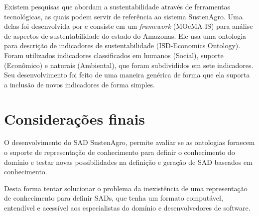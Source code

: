 Existem pesquisas que abordam a sustentabilidade através de ferramentas
tecnológicas, as quais podem servir de referência ao sistema SustenAgro.
Uma delas foi desenvolvida por \citep{brilhante:2006} e consiste
em um \emph{framework} (MOeMA-IS) para análise de aspectos de sustentabilidade
do estado do Amazonas. Ele usa uma ontologia para descrição de indicadores
de sustentabilidade (\foreignlanguage{english}{ISD-Economics Ontology}).
Foram utilizados indicadores classificados em humanos (Social), suporte
(Econômico) e naturais (Ambiental), que foram subdivididos em sete
indicadores. Seu desenvolvimento foi feito de uma maneira genérica
de forma que ela suporta a inclusão de novos indicadores de forma
simples. 


\section{Considerações finais}

 O desenvolvimento do SAD SustenAgro, permite avaliar se as ontologias
fornecem o suporte de representação de conhecimento para definir o
conhecimento do domínio e testar novas possibilidades na definição
e geração de SAD baseados em conhecimento.

Desta forma tentar solucionar o problema da inexistência de uma representação
de conhecimento para definir SADs, que tenha um formato computável,
entendível e acessível aos especialistas do domínio e desenvolvedores
de software.
